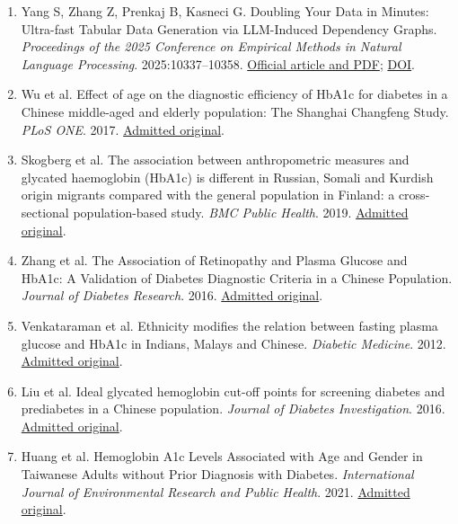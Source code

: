 \documentclass[10pt,twocolumn]{article}
\begin{document}
\begin{enumerate}
\item Yang S, Zhang Z, Prenkaj B, Kasneci G. Doubling Your Data in Minutes: Ultra-fast Tabular Data Generation via LLM-Induced Dependency Graphs. \emph{Proceedings of the 2025 Conference on Empirical Methods in Natural Language Processing}. 2025:10337–10358. \href{https://aclanthology.org/2025.emnlp-main.525/}{Official article and PDF}; \href{https://doi.org/10.18653/v1/2025.emnlp-main.525}{DOI}.

\item Wu et al. Effect of age on the diagnostic efficiency of HbA1c for diabetes in a Chinese middle-aged and elderly population: The Shanghai Changfeng Study. \emph{PLoS ONE}. 2017. \href{https://pmc.ncbi.nlm.nih.gov/articles/PMC5591004/}{Admitted original}.

\item Skogberg et al. The association between anthropometric measures and glycated haemoglobin (HbA1c) is different in Russian, Somali and Kurdish origin migrants compared with the general population in Finland: a cross-sectional population-based study. \emph{BMC Public Health}. 2019. \href{https://pmc.ncbi.nlm.nih.gov/articles/PMC6458679/}{Admitted original}.

\item Zhang et al. The Association of Retinopathy and Plasma Glucose and HbA1c: A Validation of Diabetes Diagnostic Criteria in a Chinese Population. \emph{Journal of Diabetes Research}. 2016. \href{https://pmc.ncbi.nlm.nih.gov/articles/PMC5078665/}{Admitted original}.

\item Venkataraman et al. Ethnicity modifies the relation between fasting plasma glucose and HbA1c in Indians, Malays and Chinese. \emph{Diabetic Medicine}. 2012. \href{https://pmc.ncbi.nlm.nih.gov/articles/PMC3504343/}{Admitted original}.

\item Liu et al. Ideal glycated hemoglobin cut-off points for screening diabetes and prediabetes in a Chinese population. \emph{Journal of Diabetes Investigation}. 2016. \href{https://pmc.ncbi.nlm.nih.gov/articles/PMC5009131/}{Admitted original}.

\item Huang et al. Hemoglobin A1c Levels Associated with Age and Gender in Taiwanese Adults without Prior Diagnosis with Diabetes. \emph{International Journal of Environmental Research and Public Health}. 2021. \href{https://pmc.ncbi.nlm.nih.gov/articles/PMC8038122/}{Admitted original}.


\end{enumerate}
\end{document}
